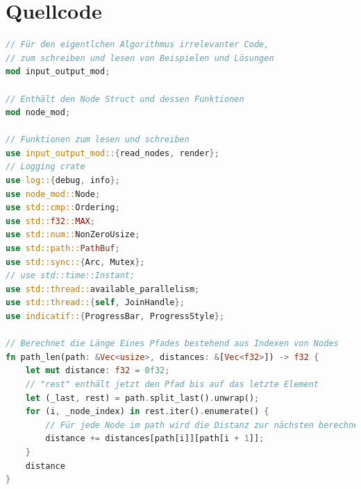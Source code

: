 \documentclass[a4paper,10pt,ngerman]{scrartcl}
\begin{document}
\begin{enumerate}
\end{enumerate}

\newpage
\section{Quellcode}
\lstset{style=boxed}
\begin{lstlisting}[language=Rust]
// Für den eigentlchen Algorithmus irrelevanter Code,
// zum schreiben und lesen von Beispielen und Lösungen
mod input_output_mod;

// Enthält den Node Struct und dessen Funktionen
mod node_mod;

// Funktionen zum lesen und schreiben
use input_output_mod::{read_nodes, render};
// Logging crate 
use log::{debug, info};
use node_mod::Node;
use std::cmp::Ordering;
use std::f32::MAX;
use std::num::NonZeroUsize;
use std::path::PathBuf;
use std::sync::{Arc, Mutex};
// use std::time::Instant;
use std::thread::available_parallelism;
use std::thread::{self, JoinHandle};
use indicatif::{ProgressBar, ProgressStyle};

// Berechnet die Länge Eines Pfades bestehend aus Indexen von Nodes
fn path_len(path: &Vec<usize>, distances: &[Vec<f32>]) -> f32 {
    let mut distance: f32 = 0f32;
    // "rest" enthält jetzt den Pfad bis auf das letzte Element
    let (_last, rest) = path.split_last().unwrap();
    for (i, _node_index) in rest.iter().enumerate() {
        // Für jede Node im path wird die Distanz zur nächsten berechnet
        distance += distances[path[i]][path[i + 1]];
    }
    distance
}


\end{lstlisting}
\end{document}
